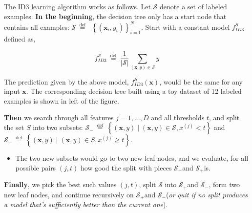\documentclass[9pt,dvipsnames]{beamer}
\begin{document}
	\begin{frame}
		The ID3 learning algorithm works as follows. Let $\mathcal{S}$ denote a set of labeled examples. \textbf{In the beginning}, the decision tree only has a start node that contains all examples: $\mathcal{S} \stackrel{\text { def }}{=}$ $\left\{\left(\mathbf{x}_{i}, y_{i}\right)\right\}_{i=1}^{N}$. Start with a constant model $f_{I D 3}^{S}$ defined as,
		
		$$
		f_{I D 3}^{\mathcal{S}} \stackrel{\text { def }}{=} \frac{1}{|\mathcal{S}|} \sum_{(\mathbf{x}, y) \in \mathcal{S}} y
		$$
		
		The prediction given by the above model, $f_{I D 3}^{S}(\mathbf{x})$, would be the same for any input $\mathbf{x}$. The corresponding decision tree built using a toy dataset of 12 labeled examples is shown in left of the figure.
	\end{frame}
	
	\begin{frame}
		\textbf{Then} we search through all features $j=1, \ldots, D$ and all thresholds $t$, and split the set $S$ into two subsets: $\mathcal{S}_{-} \stackrel{\text { def }}{=}\left\{(\mathbf{x}, y) \mid(\mathbf{x}, y) \in \mathcal{S}, x^{(j)}<t\right\}$ and $\mathcal{S}_{+} \stackrel{\text { def }}{=}\left\{(\mathbf{x}, y) \mid(\mathbf{x}, y) \in S, x^{(j)} \geq t\right\}$. 
		\begin{itemize}
			\item The two new subsets would go to two new leaf nodes, and we evaluate, for all possible pairs $(j, t)$ how good the split with pieces $\mathcal{S}_{-}$and $\mathcal{S}_{+}$is.
		\end{itemize}
		 \textbf{Finally}, we pick the best such values $(j, t)$, split $\mathcal{S}$ into $\mathcal{S}_{+}$and $\mathcal{S}_{-}$, form two new leaf nodes, and continue recursively on $\mathcal{S}_{+}$and $\mathcal{S}_{-}$(\textit{or quit if no split produces a model that's sufficiently better than the current one}).
	\end{frame}
	
\end{document}
